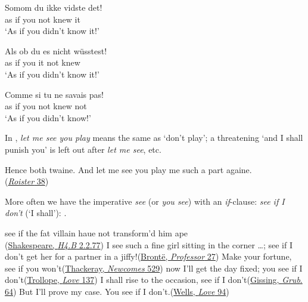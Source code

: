 \ea \label{ex:04-104}
\ea{}
\gll Somom du ikke vidste det!\\
 {as if} you not knew it\\
\glt `As if you didn't know it!'

\ex{}
\gll Als ob du es nicht wüsstest!\\
 as if you it not knew\\
\glt `As if you didn't know it!'

\ex{}
\gll Comme si tu ne savais pas!\\
 as if you not knew not\\
\glt `As if you didn't know!' %
\z
\z
{}


 \label{sec:imperatives}

In , \textit{let me see you play} means the same as `don't play'; a threatening `and I shall punish you' is left out after \textit{let me see}, etc. 

\ea \label{ex:04-107}
Hence both twaine. And let me see you play me such a part againe.\\\hfill(\href{https://archive.org/details/roisterdoister00udalgoog/page/n44/mode/2up?view=theater&q=\%22hence%2C+both%22}{\textit{Roister} 38})
\z

More often we have the imperative \textit{see} (or \textit{you see}) with an \textit{if}-clause: \textit{see if I don't} (`I shall'): .

\ea \label{ex:04-108}
\ea
see if the fat villain haue not transform'd him ape\\\hfill(\href{https://internetshakespeare.uvic.ca/doc/2H4_F1/scene/2.2/index.html#tln-850}{Shakespeare, \textit{H4.B} 2.2.77})
\ex
I see such a fine girl sitting in the corner {\dots}; see if I don't get her for a partner in a jiffy!\hfill(\href{https://archive.org/details/professortale01bron/page/46/mode/2up?q=\%22I+see+such+a+fine+girl+sitting+in+the+corner\%22&view=theater}{Brontë, \textit{Professor} 27})
\ex
Make your fortune, see if you won't\hfill(\href{https://archive.org/details/newcomesmemoirso03thac/page/138/mode/2up?q=\%22Make+your+fortune%2C+see+if+you+won%E2%80%99t\%22&view=theater}{Thackeray, \textit{Newcomes} 529})
\ex
now I'll get the day fixed; you see if I don't\hfill(\href{https://archive.org/details/anoldmanslove00trolgoog/page/n226/mode/2up?q=\%22I%E2%80%99ll+get+the+day+fixed\%22&view=theater}{Trollope, \textit{Love} 137})
\ex
I shall rise to the occasion, see if I don't\hfill(\href{https://archive.org/details/newgrubstreetnov01gissuoft/page/132/mode/2up?q=\%22shall+rise+to+the+occasion%2C+see+if+I+don%E2%80%99t+\%22&view=theater}{Gissing, \textit{Grub}. 64})
\ex 
But I'll prove my case. You see if I don't.\hfill(\href{https://archive.org/details/loveandmrlewisha00welluoft/page/94/mode/2up?q=\%22see+if\%22&view=theater}{Wells, \textit{Love} 94})
\z
\z

